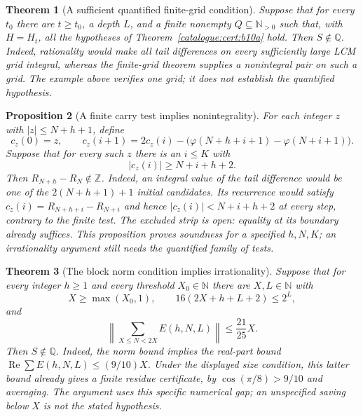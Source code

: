 \documentclass[11pt]{article}
\theoremstyle{plain}
\newtheorem{thm}{Theorem}[section]
\newtheorem{prop}[thm]{Proposition}
\theoremstyle{definition}
\theoremstyle{remark}
\newcommand{\N}{\mathbb{N}}
\begin{document}
\begin{thm}[A sufficient quantified finite-grid condition]\label{catalogue:cert:b10b}
Suppose that for every $t_0$ there are $t\ge t_0$, a depth $L$, and a
finite nonempty $Q\subseteq\mathbb N_{>0}$ such that, with $H=H_t$,
all the hypotheses of Theorem~\ref{catalogue:cert:b10a} hold.
Then $S\notin\mathbb Q$. Indeed, rationality would make all tail
differences on every sufficiently large LCM grid integral, whereas the
finite-grid theorem supplies a nonintegral pair on such a grid.
The example above verifies one grid; it does not establish the
quantified hypothesis.
\end{thm}

\begin{prop}[A finite carry test implies nonintegrality]\label{catalogue:cert:b12}
For each integer $z$ with $|z|\le N+h+1$, define
\[
 c_z(0)=z,\qquad
 c_z(i+1)=2c_z(i)-\bigl(\varphi(N+h+i+1)-\varphi(N+i+1)\bigr).
\]
Suppose that for every such $z$ there is an $i\le K$ with
\[
 |c_z(i)|\ge N+i+h+2.
\]
Then $R_{N+h}-R_N\notin\mathbb Z$. Indeed, an integral value of the
tail difference would be one of the $2(N+h+1)+1$ initial candidates.
Its recurrence would satisfy $c_z(i)=R_{N+h+i}-R_{N+i}$ and hence
$|c_z(i)|<N+i+h+2$ at every step, contrary to the finite test.
The excluded strip is open: equality at its boundary already suffices.
This proposition proves soundness for a specified $h,N,K$; an
irrationality argument still needs the quantified family of tests.
\end{prop}

\begin{thm}[The block norm condition implies irrationality]\label{catalogue:mob:e1}
Suppose that for every integer $h\ge1$ and every threshold $X_0\in\N$
there are $X,L\in\N$ with
\[
 X\ge\max(X_0,1),\qquad 16(2X+h+L+2)\le2^L,
\]
and
\[
 \left\lVert\sum_{X\le N<2X}E(h,N,L)\right\rVert\le\frac{21}{25}X.
\]
Then $S\notin\mathbb Q$. Indeed, the norm bound implies the real-part
bound $\operatorname{Re}\sum E(h,N,L)\le(9/10)X$. Under the displayed
size condition, this latter bound already gives a finite residue
certificate, by $\cos(\pi/8)>9/10$ and averaging. The argument uses this
specific numerical gap; an unspecified saving below $X$ is not the
stated hypothesis.
\end{thm}
\end{document}
